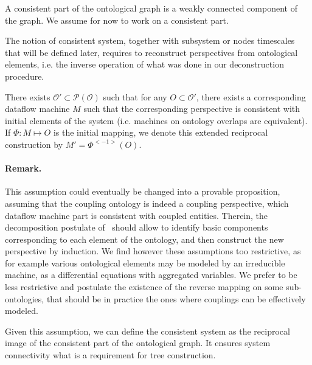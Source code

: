 \begin{definition}
A consistent part of the ontological graph is a weakly connected component of the graph. We assume for now to work on a consistent part.
\end{definition}


The notion of consistent system, together with subsystem or nodes timescales that will be defined later, requires to reconstruct perspectives from ontological elements, i.e. the inverse operation of what was done in our deconstruction procedure.

\begin{assumption}
There exists $\mathcal{O}' \subset \mathcal{P(O)}$ such that for any $O \subset \mathcal{O}'$, there exists a corresponding dataflow machine $M$ such that the corresponding perspective is consistent with initial elements of the system (i.e. machines on ontology overlaps are equivalent). If $\Phi : M \mapsto O$ is the initial mapping, we denote this extended reciprocal construction by $M' = \Phi^{<-1>}(O)$.
\end{assumption}

\paragraph{Remark.}

This assumption could eventually be changed into a provable proposition, assuming that the coupling ontology is indeed a coupling perspective, which dataflow machine part is consistent with coupled entities. Therein, the decomposition postulate of~\cite{golden2012modeling} should allow to identify basic components corresponding to each element of the ontology, and then construct the new perspective by induction. We find however these assumptions too restrictive, as for example various ontological elements may be modeled by an irreducible machine, as a differential equations with aggregated variables. We prefer to be less restrictive and postulate the existence of the reverse mapping on some sub-ontologies, that should be in practice the ones where couplings can be effectively modeled.

Given this assumption, we can define the consistent system as the reciprocal image of the consistent part of the ontological graph. It ensures system connectivity what is a requirement for tree construction.

